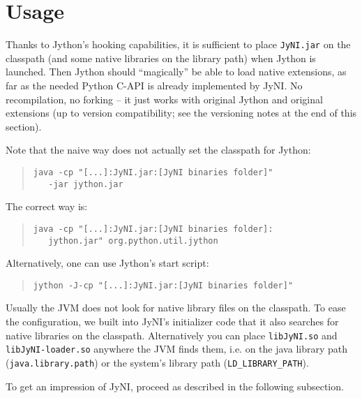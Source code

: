 \documentclass[letterpaper,compsoc,twoside]{IEEEtran}
\begin{document}
\section{Usage\label{usage}}


Thanks to Jython's hooking capabilities, it is sufficient to place \texttt{JyNI.jar} on the classpath (and some native libraries on the library path) when Jython is launched.
Then Jython should “magically” be able to load native extensions, as far as the needed Python C-API is already implemented by JyNI.
No recompilation, no forking – it just works with original Jython and original extensions (up to version compatibility; see the versioning notes at the end of this section).

Note that  the naive way does not actually set the classpath for Jython:\begin{quote}\begin{verbatim}
java -cp "[...]:JyNI.jar:[JyNI binaries folder]"
   -jar jython.jar
\end{verbatim}

\end{quote}
The correct way is:\begin{quote}\begin{verbatim}
java -cp "[...]:JyNI.jar:[JyNI binaries folder]:
   jython.jar" org.python.util.jython
\end{verbatim}

\end{quote}
Alternatively, one can use Jython's start script:\begin{quote}\begin{verbatim}
jython -J-cp "[...]:JyNI.jar:[JyNI binaries folder]"
\end{verbatim}

\end{quote}
Usually the JVM does not look for native library files on the classpath.
To ease the configuration, we built into JyNI's initializer code that it also searches for
native libraries on the classpath. Alternatively you can place \texttt{libJyNI.so} and
\texttt{libJyNI-loader.so} anywhere the JVM finds them, i.e. on the java library path (\texttt{java.library.path}) or the system's library path (\texttt{LD\_LIBRARY\_PATH}).

To get an impression of JyNI, proceed as described in the following subsection.
\end{document}
